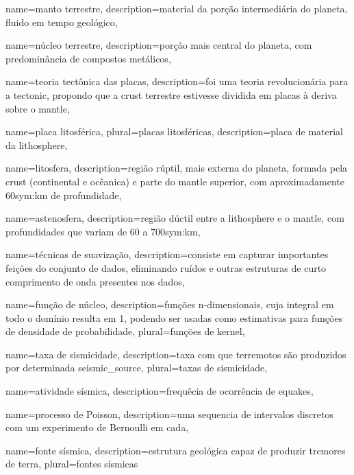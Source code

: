 {
	name={manto terrestre},
	description={material da por{ç}{ã}o intermediária do planeta, 
		fluido em tempo geológico},
}

{
	name={n{ú}cleo terrestre},
	description={por{ç}{ã}o mais central do planeta, com predomin{â}ncia de compostos metálicos},
}

{
	name={teoria tect{ô}nica das placas},
	description={foi uma teoria revolucionária para a \gls{tectonic},
				propondo que a \gls{crust} terrestre estivesse dividida 
				em placas {à} deriva sobre o \gls{mantle}},
}


{
	name={placa litosf{é}rica},
	plural={placas litosf{é}ricas},
	description={placa de material da \gls{lithosphere}},
}


{
	name={litosfera},
	description={região rúptil, mais externa do planeta, formada pela \gls{crust} 
		(continental e ocêanica) e parte do \gls{mantle} superior, com aproximadamente 
		60\gls*{sym:km} de profundidade},
}


{
	name={astenosfera},
	description={região dúctil entre a \gls{lithosphere} e o \gls{mantle},
				com profundidades que variam de 60 a 700\gls*{sym:km}},
}

{
	name={técnicas de suavização},
	description={consiste em capturar importantes feições do conjunto de dados,
				 eliminando ruídos e outras estruturas de curto comprimento de onda
				 presentes nos dados},
}

{
	name={função de núcleo},
	description={funções n-dimensionais, cuja integral em todo o domínio resulta em 1,
				 podendo ser usadas como estimativas para 
				 funções de densidade de probabilidade},
	plural={funções de kernel},
}

{
	name={taxa de sismicidade},
	description={taxa com que terremotos são produzidos por determinada \gls{seismic_source}},
	plural={taxas de sismicidade},
}

{
	name={atividade sísmica},
	description={frequ{ê}cia de ocorr{ê}ncia de \glspl{equake}},
}

{
	name={processo de Poisson},
	description={uma sequencia de intervalos discretos com um experimento de Bernoulli em cada},
}

{
	name={fonte sísmica},
	description={estrutura geológica capaz de produzir tremores de terra},
	plural={fontes sísmicas}
}

